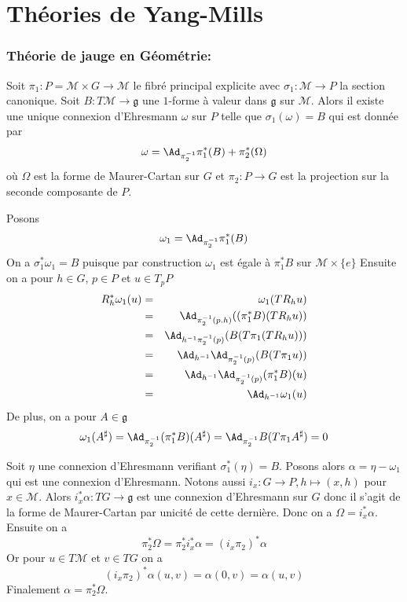\section{Théories de Yang-Mills}

\subsubsection{Théorie de jauge en Géométrie:}

\begin{pro}
Soit $\pi_1 : P = \mathcal{M}\times G \to \mathcal{M}$ le fibré principal explicite avec $\sigma_1: \mathcal{M} \to P$ la section canonique. Soit $B: T\mathcal{M} \to \mathfrak{g}$ une $1$-forme à valeur dans $\mathfrak{g}$ sur $\mathcal{M}$. Alors il existe une unique connexion d'Ehresmann $\omega$ sur $P$ telle que $\sigma_1(\omega) = B$ qui est donnée par
$$\omega = \Ad_{\pi_2^{-1}}\pi_1^*(B) + \pi_2^*(\Omega)$$
où $\Omega$ est la forme de Maurer-Cartan sur $G$ et $\pi_2: P\to G$ est la projection sur la seconde composante de $P$.
\end{pro}
\begin{preu}
Posons
$$\omega_1 = \Ad_{\pi_2^{-1}}\pi_1^*(B)$$
On a $\sigma_1^*\omega_1 = B$ puisque par construction $\omega_1$ est égale à $\pi_1^*B$ sur $\mathcal{M}\times \{e\}$
Ensuite on a pour $h\in G$, $p\in P$ et $u\in T_pP$
\begin{eqnarray*}
R_h^*\omega_1(u) &=& \omega_1(TR_h u) \\
&=& \Ad_{\pi_2^{-1}(p.h)}((\pi_1^*B)(TR_h u)) \\
&=& \Ad_{h^{-1}\pi_2^{-1}(p)}(B(T\pi_1(TR_h u))) \\
&=& \Ad_{h^{-1}}\Ad_{\pi_2^{-1}(p)}(B(T\pi_1 u)) \\
&=& \Ad_{h^{-1}}\Ad_{\pi_2^{-1}(p)}(\pi_1^* B)(u) \\
&=& \Ad_{h^{-1}}\omega_1(u)
\end{eqnarray*}
De plus, on a pour $A\in \mathfrak{g}$ 
$$\omega_1(A^\sharp) = \Ad_{\pi_2^{-1}}(\pi_1^*B)(A^\sharp) = \Ad_{\pi_2^{-1}} B(T\pi_1 A^\sharp) = 0$$ 

Soit $\eta$ une connexion d'Ehresmann verifiant $\sigma_1^*(\eta) = B$. Posons alors $\alpha = \eta - \omega_1$ qui est une connexion d'Ehresmann. Notons aussi $i_x: G\to P, h \mapsto (x, h)$ pour $x\in \mathcal{M}$. Alors $i_x^*\alpha: TG \to \mathfrak{g}$ est une connexion d'Ehresmann sur $G$ donc il s'agit de la forme de Maurer-Cartan par unicité de cette dernière. Donc on a $\Omega = i_x^*\alpha$. Ensuite on a 
$$\pi_2^*\Omega = \pi_2^*i_x^*\alpha = (i_x\pi_2)^*\alpha$$
Or pour $u\in T\mathcal{M}$ et $v\in TG$ on a
$$(i_x\pi_2)^*\alpha(u,v) = \alpha(0, v) = \alpha(u, v)$$
Finalement $\alpha = \pi_2^*\Omega$.
\end{preu}

